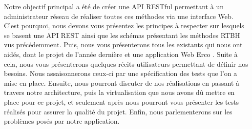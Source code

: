 \vspace{2em}

Notre objectif principal a été de créer une API RESTful permettant à un administrateur réseau de réaliser toutes ces méthodes via une interface Web. C'est pourquoi, nous devons vous présentez les principes à respecter sur lesquels se basent une API REST ainsi que les schémas présentant les méthodes RTBH vus précédemment. Puis, nous vous présenterons tous les existants qui nous ont aidés, dont le projet de l'année dernière \cite{PMCB18} et une application Web Erco \cite{Erc16}. Suite à cela, nous vous présenterons quelques récits utilisateurs permettant de définir nos besoins. Nous assaisonnerons ceux-ci par une spécification des tests que l'on a mise en place. Ensuite, nous pourront discuter de nos réalisations en passant à travers notre architecture, puis la virtualisation que nous avons dû mettre en place pour ce projet, et seulement après nous pourront vous présenter les tests réalisés pour assurer la qualité du projet. Enfin, nous parlementerons sur les problèmes posés par notre application.
